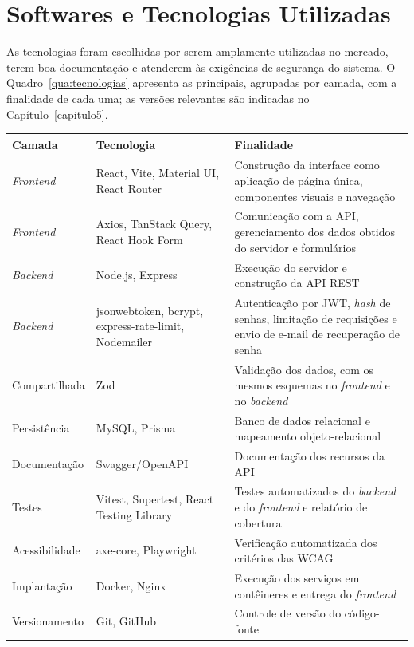 \section{Softwares e Tecnologias Utilizadas}\label{sec:tecnologias}

As tecnologias foram escolhidas por serem amplamente utilizadas no mercado, terem boa documentação e atenderem às exigências de segurança do sistema. O Quadro~\ref{qua:tecnologias} apresenta as principais, agrupadas por camada, com a finalidade de cada uma; as versões relevantes são indicadas no Capítulo~\ref{capitulo5}.

\begin{quadro}[H]
\centering
\footnotesize
\caption{Tecnologias utilizadas no desenvolvimento do sistema}
\begin{tabular}{|p{2.6cm}|p{4.4cm}|p{7.2cm}|}
\hline
\textbf{Camada} & \textbf{Tecnologia} & \textbf{Finalidade} \\ \hline
\textit{Frontend} & React, Vite, Material UI, React Router & Construção da interface como aplicação de página única, componentes visuais e navegação \\ \hline
\textit{Frontend} & Axios, TanStack Query, React Hook Form & Comunicação com a API, gerenciamento dos dados obtidos do servidor e formulários \\ \hline
\textit{Backend} & Node.js, Express & Execução do servidor e construção da API REST \\ \hline
\textit{Backend} & jsonwebtoken, bcrypt, express-rate-limit, Nodemailer & Autenticação por JWT, \textit{hash} de senhas, limitação de requisições e envio de e-mail de recuperação de senha \\ \hline
Compartilhada & Zod & Validação dos dados, com os mesmos esquemas no \textit{frontend} e no \textit{backend} \\ \hline
Persistência & MySQL, Prisma & Banco de dados relacional e mapeamento objeto-relacional \\ \hline
Documentação & Swagger/OpenAPI & Documentação dos recursos da API \\ \hline
Testes & Vitest, Supertest, React Testing Library & Testes automatizados do \textit{backend} e do \textit{frontend} e relatório de cobertura \\ \hline
Acessibilidade & axe-core, Playwright & Verificação automatizada dos critérios das WCAG \\ \hline
Implantação & Docker, Nginx & Execução dos serviços em contêineres e entrega do \textit{frontend} \\ \hline
Versionamento & Git, GitHub & Controle de versão do código-fonte \\ \hline
\end{tabular}
\label{qua:tecnologias}
\end{quadro}

